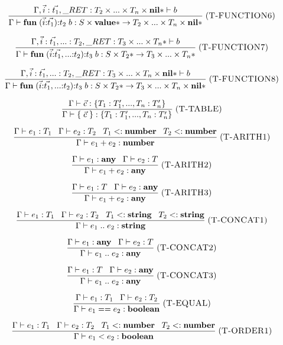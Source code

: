 \documentclass[12pt]{article}
\newcommand{\Top}{\mathbf{value}}
\newcommand{\Any}{\mathbf{any}}
\newcommand{\Nil}{\mathbf{nil}}
\newcommand{\Boolean}{\mathbf{boolean}}
\newcommand{\Number}{\mathbf{number}}
\newcommand{\String}{\mathbf{string}}
\newcommand{\kw}[1]{\mathbf{#1}}
\newcommand{\mylabel}[1]{\; (\textsc{#1})}
\newcommand{\subtype}{<:}
\newcommand{\env}{\Gamma}
\newcommand{\ret}{\string_RET}
\begin{document}
\[
\frac{\env, \vec{i}:\vec{t_{1}},
      \ret:T_{2} \times ... \times T_{n} \times \Nil{*} \vdash b}
     {\env \vdash \kw{fun} \; (\vec{i}{:}\vec{t_{1}}){:}t_{2} \; b :
      S \times \Top{*} \rightarrow T_{2} \times ... \times T_{n} \times \Nil{*}}
\mylabel{T-FUNCTION6}
\]

\[
\frac{\env, \vec{i}:\vec{t_{1}}, {...}:T_{2},
      \ret:T_{3} \times ... \times T_{n}* \vdash b}
     {\env \vdash \kw{fun} \; (\vec{i}{:}\vec{t_{1}},{...}{:}t_{2}){:}t_{3} \; b :
      S \times T_{2}* \rightarrow T_{3} \times ... \times T_{n}*}
\mylabel{T-FUNCTION7}
\]

\[
\frac{\env, \vec{i}:\vec{t_{1}}, {...}:T_{2},
      \ret:T_{3} \times ... \times T_{n} \times \Nil{*} \vdash b}
     {\env \vdash \kw{fun} \; (\vec{i}{:}\vec{t_{1}},{...}{:}t_{2}){:}t_{3} \; b :
      S \times T_{2}* \rightarrow T_{3} \times ... \times T_{n} \times \Nil{*}}
\mylabel{T-FUNCTION8}
\]

\[
\frac{\env \vdash \vec{c} : \{ T_{1}:T_{1}', ..., T_{n}:T_{n}' \}}
     {\env \vdash \{ \; \vec{c} \; \} : \{ T_{1}:T_{1}', ..., T_{n}:T_{n}' \}}
\mylabel{T-TABLE}
\]

\[
\frac{\env \vdash e_{1}:T_{1} \;\;\;
      \env \vdash e_{2}:T_{2} \;\;\;
      T_{1} \subtype \Number \;\;\;
      T_{2} \subtype \Number}
     {\env \vdash e_{1} + e_{2} : \Number}
\mylabel{T-ARITH1}
\]

\[
\frac{\env \vdash e_{1}:\Any \;\;\;
      \env \vdash e_{2}:T}
     {\env \vdash e_{1} + e_{2} : \Any}
\mylabel{T-ARITH2}
\]

\[
\frac{\env \vdash e_{1}:T \;\;\;
      \env \vdash e_{2}:\Any}
     {\env \vdash e_{1} + e_{2} : \Any}
\mylabel{T-ARITH3}
\]

\[
\frac{\env \vdash e_{1}:T_{1} \;\;\;
      \env \vdash e_{2}:T_{2} \;\;\;
      T_{1} \subtype \String \;\;\;
      T_{2} \subtype \String}
     {\env \vdash e_{1} \; {..} \; e_{2} : \String}
\mylabel{T-CONCAT1}
\]

\[
\frac{\env \vdash e_{1}:\Any \;\;\;
      \env \vdash e_{2}:T}
     {\env \vdash e_{1} \; {..} \; e_{2} : \Any}
\mylabel{T-CONCAT2}
\]

\[
\frac{\env \vdash e_{1}:T \;\;\;
      \env \vdash e_{2}:\Any}
     {\env \vdash e_{1} \; {..} \; e_{2} : \Any}
\mylabel{T-CONCAT3}
\]

\[
\frac{\env \vdash e_{1}:T_{1} \;\;\;
      \env \vdash e_{2}:T_{2}}
     {\env \vdash e_{1} == e_{2} : \Boolean}
\mylabel{T-EQUAL}
\]

\[
\frac{\env \vdash e_{1}:T_{1} \;\;\;
      \env \vdash e_{2}:T_{2} \;\;\;
      T_{1} \subtype \Number \;\;\;
      T_{2} \subtype \Number}
     {\env \vdash e_{1} < e_{2} : \Boolean}
\mylabel{T-ORDER1}
\]
\end{document}
